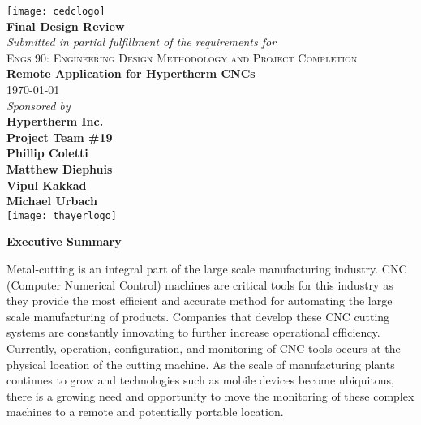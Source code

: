\documentclass[12pt,letterpaper,titlepage]{article}
\begin{document}
\begin{titlepage}
\begin{center}
\texttt{[image: cedclogo]}\\
\vspace{.5in}
\textbf{\Large Final Design Review}\\
\vspace{.3in}
\emph{Submitted in partial fulfillment of the requirements for}\\
\vspace{.1in}
\textsc{Engs 90: Engineering Design Methodology and Project Completion}\\
\vspace{.5in}
\textbf{\LARGE Remote Application for Hypertherm CNCs}\\
\vspace{.1in}
\today \\
\vspace{.5in}
\emph{Sponsored by}\\
\vspace{.1in}
\textbf{\Large Hypertherm Inc.}\\
\vspace{.5in}
\textbf{\Large Project Team \#19}\\
\vspace{.1in}
\textbf{Phillip Coletti \\ Matthew Diephuis \\ Vipul Kakkad \\ Michael Urbach \\}
\vspace{1in}
\texttt{[image: thayerlogo]}
\end{center}
\end{titlepage}

\thispagestyle{empty}
\tableofcontents
\thispagestyle{empty}

\clearpage	
\newpage
\begin{center}\textbf{\Large Executive Summary}\end{center}

Metal-cutting is an integral part of the large scale manufacturing industry. CNC (Computer Numerical Control) machines are critical tools for this industry as they provide the most efficient and accurate method for automating the large scale manufacturing of products. Companies that develop these CNC cutting systems are constantly innovating to further increase operational efficiency. Currently, operation, configuration, and monitoring of CNC tools occurs at the physical location of the cutting machine. As the scale of manufacturing plants continues to grow and technologies such as mobile devices become ubiquitous, there is a growing need and opportunity to move the monitoring of these complex machines to a remote and potentially portable location.
\end{document}
